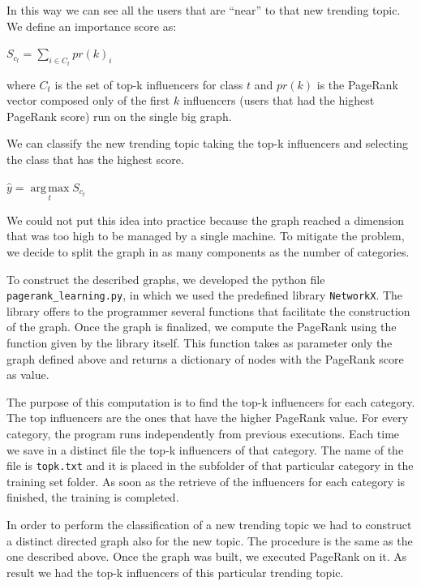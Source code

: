 \documentclass[journal,11pt]{vgtc}
\DeclareMathOperator*{\argmax}{arg\,max}
\begin{document}
\bigskip

In this way we can see all the users that are ``near'' to that new trending topic.
We define an importance score as:

\medskip

\begin{center}
$
S_{c_t}=\sum\limits_{i \in C_t} pr(k)_i
$
\end{center}

\medskip

where $C_t$ is the set of top-k influencers for class $t$ and $pr(k)$ is the PageRank vector composed
only of the first $k$ influencers (users that had the highest PageRank score) run on the single big graph.

We can classify the new trending topic taking the top-k influencers and selecting the class that has the highest score.

\medskip

\begin{center}
$
\hat{y}=\argmax\limits_{t} S_{c_t}
$
\end{center}

\medskip

We could not put this idea into practice because the graph reached a dimension that was too high
to be managed by a single machine.
To mitigate the problem, we decide to split the graph in as many components as the number of categories.

To construct the described graphs, we developed the python file \texttt{pagerank\_learning.py},
in which we used the predefined library \texttt{NetworkX}.
The library offers to the programmer several functions that facilitate the construction of the graph.
Once the graph is finalized, we compute the PageRank using the function given by the library itself.
This function takes as parameter only the graph defined above and returns a dictionary of nodes
with the PageRank score as value.

The purpose of this computation is to find the top-k influencers for each category. The top influencers
are the ones that have the higher PageRank value.
For every category, the program runs independently from previous executions. Each time we save in a
distinct file the top-k influencers of that category. The name of the file is
\texttt{topk.txt} and it is placed in the subfolder of that particular category in the training set folder.
As soon as the retrieve of the influencers for each category is finished, the training is completed.

In order to perform the classification of a new trending topic we had to construct a distinct directed graph
also for the new topic. The procedure is the same as the one described above.
Once the graph was built, we executed PageRank on it.
As result we had the top-k influencers of this particular trending topic.
\end{document}
